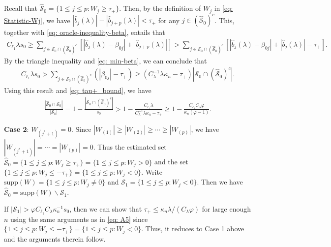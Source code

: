 \documentclass[11pt]{article}
\begin{document}
Recall that $\widehat{\mathcal{S}}_0=\{1\leq j\leq p: W_j\geq \tau_{+}\}$. Then, by the definition of $W_j$ in \eqref{eq: Statistic-Wj}, we have $|\widehat{b}_j(\lambda)| - |\widehat{b}_{j+p}(\lambda)|< \tau_{+}$ for any $j\in (\widehat{\mathcal{S}}_0)^c$. This, together with \eqref{eq: oracle-inequality-beta}, entails that
\begin{align*}
C_{\ell_1}\lambda s_0
\geq \sum_{j\in \mathcal{S}_0\cap (\widehat{\mathcal{S}}_0)^c}\left[|\widehat{b}_j(\lambda)-\beta_{0j}|+ |\widehat{b}_{j+p}(\lambda)|\right]
> \sum_{j\in \mathcal{S}_0\cap (\widehat{\mathcal{S}}_0)^c}\left[|\widehat{b}_j(\lambda)-\beta_{0j}|+ |\widehat{b}_{j}(\lambda)|-\tau_{+}\right].
\end{align*}
By the triangle inequality and \eqref{eq: min-beta}, we can conclude that
\begin{align*}
C_{\ell_1}\lambda s_0
> \sum_{j\in \mathcal{S}_0\cap (\widehat{\mathcal{S}}_0)^c}\left(|\beta_{0j}|-\tau_{+}\right)
\geq (C_{\lambda}^{-1}\lambda\kappa_n-\tau_{+})|\mathcal{S}_0\cap (\widehat{\mathcal{S}}_0)^c|.
\end{align*}
Using this result and \eqref{eq: tau+_bound}, we have
\begin{align}\label{eq: case1-bound}
\frac{|\widehat{\mathcal{S}}_0 \cap \mathcal{S}_0|}{|\mathcal{S}_0|}
=1- \frac{|\mathcal{S}_0\cap (\widehat{\mathcal{S}}_0)^c|}{s_0}
> 1- \frac{C_{\ell_1}\lambda}{C_{\lambda}^{-1}\lambda\kappa_n-\tau_{+}} 
\geq 1-\frac{C_{\ell_1}C_{\lambda}\varphi}{\kappa_n(\varphi-1)}.
\end{align}


{\bf Case 2}: $W_{(j^{*}+1)}=0$. Since $|W_{(1)}|\geq |W_{(2)}|\geq \cdots\geq  |W_{(p)}|$, we have $|W_{(j^{*}+1)}|= \cdots=|W_{(p)}|=0$. Thus the estimated set $\widehat{\mathcal{S}}_0=\{1\leq j\leq p: W_j\geq \tau_{+}\}=\{1\leq j\leq p: W_j>0\}$ and the set $\{1\leq j\leq p: W_j\leq -\tau_{+}\}=\{1\leq j\leq p: W_j<0\}$. 
Write $\mbox{supp}(W)=\{1\leq j\leq p: W_j\neq 0\}$ and  $\mathcal{S}_{1}=\{1\leq j\leq p: W_j< 0\}$. 
Then we have $\widehat{\mathcal{S}}_0=\mbox{supp}(W)\backslash\mathcal{S}_{1}$.

If $|\mathcal{S}_{1}|>\varphi C_{\ell_1}C_{\lambda}\kappa_n^{-1}s_0$, then 
we can show that $\tau_{+}\leq \kappa_n\lambda/(C_{\lambda}\varphi)$ for large enough $n$ using the same arguments as in \eqref{eq: A5} since $\{1\leq j\leq p: W_j\leq -\tau_{+}\}=\{1\leq j\leq p: W_j<0\}$. Thus, it reduces to Case 1 above
and the arguments therein follow.
\end{document}
